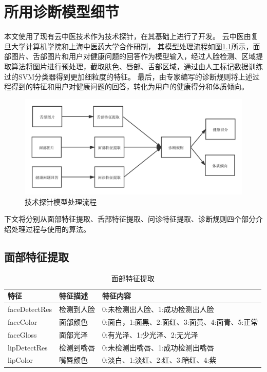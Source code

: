 \appendix
\addappheadtotoc
\chapter{所用诊断模型细节}
\label{ch:appendix}

本文使用了现有云中医技术作为技术探针，在其基础上进行了开发。
云中医由复旦大学计算机学院和上海中医药大学合作研制，
其模型处理流程如图\ref{fig:cloudmed2}所示，面部图片、舌部图片和用户对健康问题的回答作为模型输入，经过人脸检测、区域提取算法将图片进行预处理，截取肤色、唇部、舌部区域，通过由人工标记数据训练过的SVM分类器得到更加细粒度的特征。
最后，由专家编写的诊断规则将上述过程得到的特征和用户对健康问题的回答，转化为用户的健康得分和体质倾向。

\begin{figure}[htb]
    \centering
    \includegraphics[width=15cm]{images/cloud_med3.png}
    \caption{技术探针模型处理流程}
    \label{fig:cloudmed2}
\end{figure}

下文将分别从面部特征提取、舌部特征提取、问诊特征提取、诊断规则四个部分介绍处理过程与使用的算法。

\section{面部特征提取}
\label{subsec:face_feature}

\begin{table}[h]
    \centering
    \caption{面部特征提取}
    \begin{tabular}{lll}
        \toprule
        特征          & 特征描述     & 特征内容 \\
        \midrule
        faceDetectRes & 检测到人脸   & 0:未检测出人脸、1:成功检测出人脸  \\
        faceColor     & 面部颜色 & 0:面白，1:面黑、2:面红、3:面黄、4:面青、5:正常 \\
        faceGloss     & 面部光泽 & 0:有光泽、1:少光泽、2:无光泽\\
        lipDetectRes  & 检测到嘴唇   & 0:未检测出嘴唇、1:成功检测出嘴唇\\
        lipColor      & 嘴唇颜色 & 0:淡白、1:淡红、2:红、3:暗红、4:紫   \\
        \bottomrule
    \end{tabular}
    \label{tab:face-feature}
\end{table}

